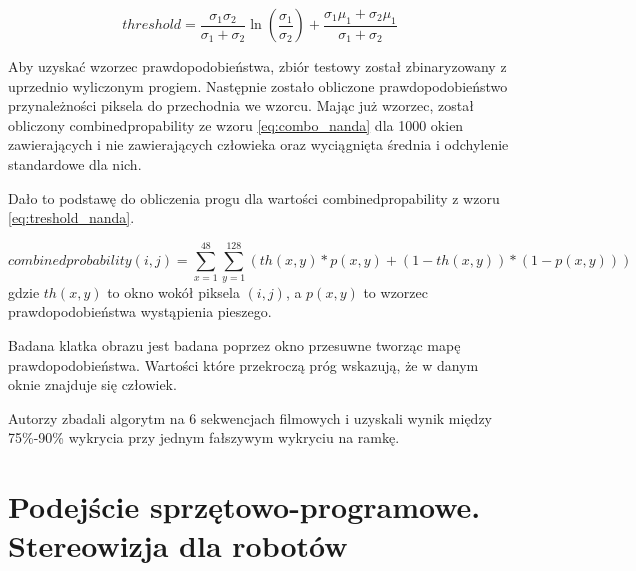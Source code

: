 \begin{equation} \label{eq:treshold_nanda}
threshold = \frac{\sigma_1 \sigma_2}{ \sigma_1 + \sigma_2} \ln\left ( \frac{\sigma_1}{\sigma_2} \right ) + \frac{\sigma_1\mu_1 + \sigma_2\mu_1}{\sigma_1+\sigma_2}\end{equation}

Aby uzyskać wzorzec prawdopodobieństwa, zbiór testowy został zbinaryzowany z uprzednio wyliczonym progiem. 
Następnie zostało obliczone prawdopodobieństwo przynależności piksela do przechodnia we wzorcu. %
Mając już wzorzec, został obliczony combinedpropability ze wzoru \eqref{eq:combo_nanda} dla 1000 okien zawierających i nie zawierających człowieka oraz wyciągnięta średnia i odchylenie standardowe dla nich. 


Dało to podstawę do obliczenia progu dla wartości combinedpropability z wzoru \eqref{eq:treshold_nanda}. 

\begin{equation} \label{eq:combo_nanda} combinedprobability(i,j)=\sum_{x=1}^{48}\sum_{y=1}^{128}(th(x,y)*p(x,y)+(1-th(x,y))*(1-p(x,y)))\end{equation}
\noindent
gdzie \(th(x,y)\) to okno wokół piksela \((i,j)\), a \(p(x,y)\) to wzorzec prawdopodobieństwa wystąpienia pieszego.

Badana klatka obrazu jest badana poprzez okno przesuwne tworząc mapę prawdopodobieństwa. %
Wartości które przekroczą próg wskazują, że w danym oknie znajduje się człowiek. 

Autorzy zbadali algorytm na 6 sekwencjach filmowych i uzyskali wynik między 75\%-90\% wykrycia przy jednym fałszywym wykryciu na ramkę. %


\section{Podejście sprzętowo-programowe. Stereowizja dla robotów }

